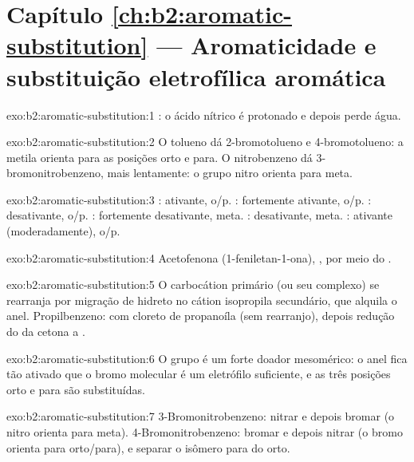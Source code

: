 \section*{Capítulo \ref{ch:b2:aromatic-substitution} --- Aromaticidade e substituição eletrofílica aromática}

\begin{solution}{exo:b2:aromatic-substitution:1}
: o ácido nítrico é protonado e depois perde água.
\end{solution}

\begin{solution}{exo:b2:aromatic-substitution:2}
O tolueno dá 2-bromotolueno e 4-bromotolueno: a metila orienta para as
posições orto e para. O nitrobenzeno dá 3-bromonitrobenzeno, mais lentamente: o
grupo nitro orienta para meta.
\end{solution}

\begin{solution}{exo:b2:aromatic-substitution:3}
: ativante, o/p. : fortemente ativante, o/p. : desativante, o/p.
: fortemente desativante, meta. : desativante, meta. :
ativante (moderadamente), o/p.
\end{solution}

\begin{solution}{exo:b2:aromatic-substitution:4}
Acetofenona (1-feniletan-1-ona), , por meio do  .
\end{solution}

\begin{solution}{exo:b2:aromatic-substitution:5}
O carbocátion primário (ou seu complexo) se rearranja por migração de hidreto no
cátion isopropila secundário, que alquila o anel. Propilbenzeno:  com cloreto de propanoíla (sem rearranjo), depois redução do
 da cetona a .
\end{solution}

\begin{solution}{exo:b2:aromatic-substitution:6}
O grupo  é um forte doador mesomérico: o anel fica tão ativado que o
bromo molecular é um eletrófilo suficiente, e as três posições orto e para são
substituídas.
\end{solution}

\begin{solution}{exo:b2:aromatic-substitution:7}
3-Bromonitrobenzeno: nitrar e depois bromar (o nitro orienta para meta).
4-Bromonitrobenzeno: bromar e depois nitrar (o bromo orienta para orto/para), e
separar o isômero para do orto.
\end{solution}

